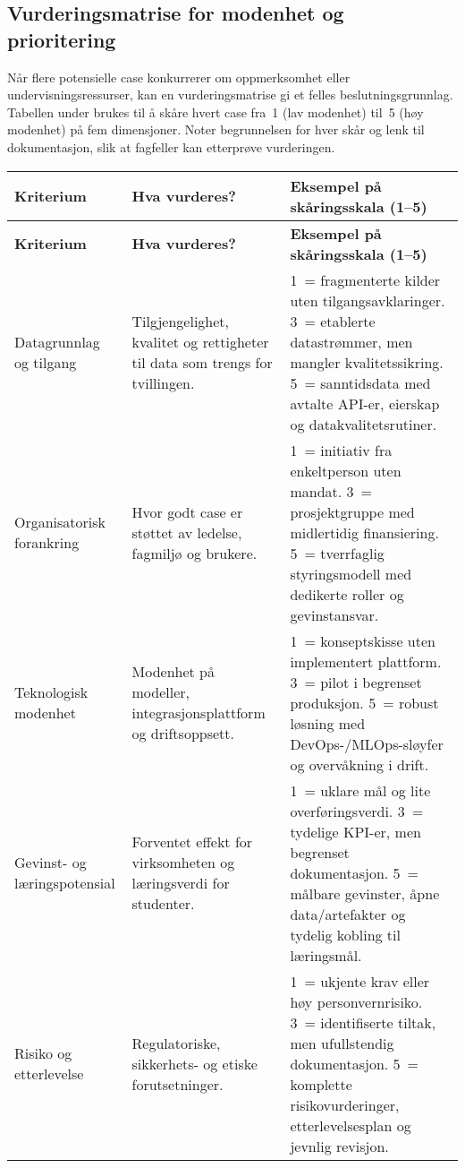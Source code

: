 \subsection*{Vurderingsmatrise for modenhet og prioritering}
Når flere potensielle case konkurrerer om oppmerksomhet eller undervisningsressurser, kan en vurderingsmatrise gi et felles
beslutningsgrunnlag. Tabellen under brukes til å skåre hvert case fra~1 (lav modenhet) til~5 (høy modenhet) på fem dimensjoner.
Noter begrunnelsen for hver skår og lenk til dokumentasjon, slik at fagfeller kan etterprøve vurderingen.

\begin{longtable}{p{}p{}p{}}
\toprule
\textbf{Kriterium} & \textbf{Hva vurderes?} & \textbf{Eksempel på skåringsskala (1--5)} \\
\midrule
\endfirsthead
\toprule
\textbf{Kriterium} & \textbf{Hva vurderes?} & \textbf{Eksempel på skåringsskala (1--5)} \\
\midrule
\endhead
Datagrunnlag og tilgang & Tilgjengelighet, kvalitet og rettigheter til data som trengs for tvillingen. & 1~= fragmenterte kilder uten tilgangsavklaringer. 3~= etablerte datastrømmer, men mangler kvalitetssikring. 5~= sanntidsdata med avtalte API-er, eierskap og datakvalitetsrutiner. \\
\addlinespace
Organisatorisk forankring & Hvor godt case er støttet av ledelse, fagmiljø og brukere. & 1~= initiativ fra enkeltperson uten mandat. 3~= prosjektgruppe med midlertidig finansiering. 5~= tverrfaglig styringsmodell med dedikerte roller og gevinstansvar. \\
\addlinespace
Teknologisk modenhet & Modenhet på modeller, integrasjonsplattform og driftsoppsett. & 1~= konseptskisse uten implementert plattform. 3~= pilot i begrenset produksjon. 5~= robust løsning med DevOps-/MLOps-sløyfer og overvåkning i drift. \\
\addlinespace
Gevinst- og læringspotensial & Forventet effekt for virksomheten og læringsverdi for studenter. & 1~= uklare mål og lite overføringsverdi. 3~= tydelige KPI-er, men begrenset dokumentasjon. 5~= målbare gevinster, åpne data/artefakter og tydelig kobling til læringsmål. \\
\addlinespace
Risiko og etterlevelse & Regulatoriske, sikkerhets- og etiske forutsetninger. & 1~= ukjente krav eller høy personvernrisiko. 3~= identifiserte tiltak, men ufullstendig dokumentasjon. 5~= komplette risikovurderinger, etterlevelsesplan og jevnlig revisjon. \\
\bottomrule
\end{longtable}

